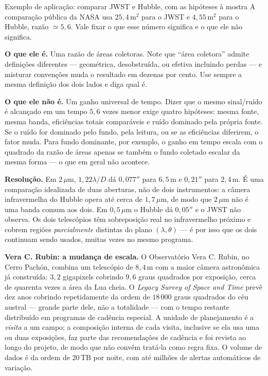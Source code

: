 \documentclass[11pt,a4paper]{article}
\begin{document}
\begin{lessonblock}{Exemplo de aplicação: comparar JWST e Hubble, com as hipóteses à mostra}
A comparação pública da NASA usa $25{,}4\,\mathrm{m^2}$ para o JWST e $4{,}55\,\mathrm{m^2}$ para o Hubble, razão
$\simeq5{,}6$. Vale fixar o que esse número significa e o que ele não significa.

\textbf{O que ele é.} Uma razão de áreas coletoras. Note que ``área coletora'' admite definições diferentes ---
geométrica, desobstruída, ou efetiva incluindo perdas --- e misturar convenções muda o resultado em dezenas por
cento. Use sempre a mesma definição dos dois lados e diga qual é.

\textbf{O que ele não é.} Um ganho universal de tempo. Dizer que o mesmo sinal/ruído é alcançado em um tempo
$5{,}6$ vezes menor exige quatro hipóteses: mesma fonte, mesma banda, eficiências totais comparáveis e ruído
dominado pela própria fonte. Se o ruído for dominado pelo fundo, pela leitura, ou se as eficiências diferirem, o
fator muda. Para fundo dominante, por exemplo, o ganho em tempo escala com o quadrado da razão de áreas apenas se
também o fundo coletado escalar da mesma forma --- o que em geral não acontece.

\textbf{Resolução.} Em $2\,\mu\mathrm{m}$, $1{,}22\lambda/D$ dá $0{,}077''$ para $6{,}5\,\mathrm{m}$ e $0{,}21''$
para $2{,}4\,\mathrm{m}$. É uma comparação idealizada de duas aberturas, não de dois instrumentos: a câmera
infravermelha do Hubble opera até cerca de $1{,}7\,\mu\mathrm{m}$, de modo que $2\,\mu\mathrm{m}$ não é uma banda
comum aos dois. Em $0{,}5\,\mu\mathrm{m}$ o Hubble dá $0{,}05''$ e o JWST não observa. Os dois telescópios têm
sobreposição real no infravermelho próximo e cobrem regiões \emph{parcialmente} distintas do plano
$(\lambda,\theta)$ --- é por isso que os dois continuam sendo usados, muitas vezes no mesmo programa.
\end{lessonblock}

\textbf{Vera C. Rubin: a mudança de escala.} O Observatório Vera C. Rubin, no Cerro Pachón, combina um telescópio
de $8{,}4\,\mathrm{m}$ com a maior câmera astronômica já construída: $3{,}2$ gigapixels cobrindo
$9{,}6$ graus quadrados por exposição, cerca de quarenta vezes a área da Lua cheia. O \textit{Legacy Survey of
Space and Time} prevê dez anos cobrindo repetidamente da ordem de $18\,000$ graus quadrados do céu austral ---
grande parte dele, não a totalidade --- com o tempo restante distribuído em programas de cadência especial. A
unidade de planejamento é a \emph{visita} a um campo; a composição interna de cada visita, inclusive se ela usa
uma ou duas exposições, faz parte das recomendações de cadência e foi revista ao longo do projeto, de modo que
não convém tratá-la como regra fixa. O volume de dados é da ordem de $20\,\mathrm{TB}$ por noite, com até milhões
de alertas automáticos de variação.
\end{document}

